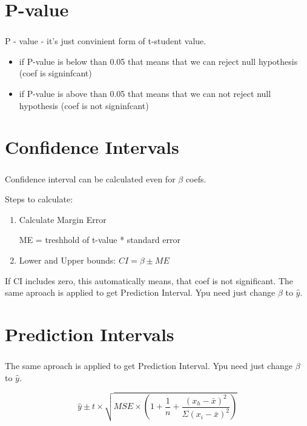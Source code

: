 \documentclass[t, 11pt]{beamer}
\begin{document}
\section{P-value}
	\begin{frame} 
		\frametitle{\insertsection} 
	 	P - value - it's just convinient form of t-student value. 
		\begin{itemize}
			\item if P-value is below than 0.05 that means that we can reject null hypothesis (coef is signinfcant)
			\item if  P-value is above than 0.05 that means that we can not reject null hypothesis (coef is not  signinfcant)
			\end{itemize}
		
	\end{frame}	

\section{Confidence Intervals}

\begin{frame}
	\frametitle{\insertsection} 
	Confidence interval can be calculated even for $\beta$ coefs. 
	
	Steps to calculate:
	\begin{enumerate}
		\item Calculate Margin Error
		
		ME = treshhold of t-value * standard error
		
		\item Lower and Upper bounds: $ CI = \beta \pm ME$ 
		\end{enumerate}
	
\vspace{1cm}

If CI includes zero, this automatically means, that coef is not significant. The same aproach is applied to get Prediction Interval. Ypu need just change $\beta$ to $\hat{y}$. 
	
	\end{frame}

\section{Prediction Intervals}

\begin{frame}
	\frametitle{\insertsection} 
	The same aproach is applied to get Prediction Interval. Ypu need just change $\beta$ to $\hat{y}$. 
	
	$$\hat{y} \pm t \times \sqrt{ MSE \times (1 + \frac{1}{n} + \frac{(x_h- \bar{x})^2}{\Sigma (x_i- \bar{x})^2}) }$$
	
\end{frame}
\end{document}
